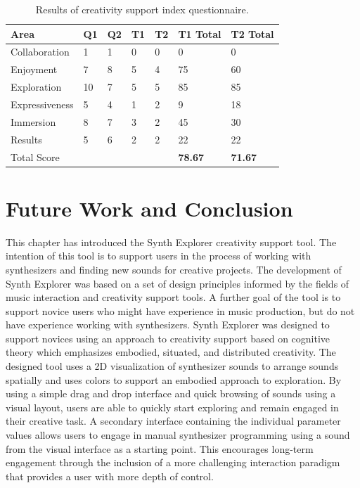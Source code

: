\begin{table}[th]
\centering
\begin{tabular}{l|llll|ll}
Area           & Q1 & Q2 & T1 & T2 & T1 Total   & T2 Total \\
\hline
Collaboration  & 1  & 1  & 0            & 0            & 0              & 0            \\
Enjoyment      & 7  & 8  & 5            & 4            & 75             & 60           \\
Exploration    & 10 & 7  & 5            & 5            & 85             & 85           \\
Expressiveness & 5  & 4  & 1            & 2            & 9              & 18           \\
Immersion      & 8  & 7  & 3            & 2            & 45             & 30           \\
Results        & 5  & 6  & 2            & 2            & 22             & 22           \\
Total Score    &    &    &              &              & \textbf{78.67} & \textbf{71.67} 
\end{tabular}
\caption{Results of creativity support index questionnaire.}
\label{table:csi}
\end{table}

\section{Future Work and Conclusion}
This chapter has introduced the Synth Explorer creativity support tool. The intention of this tool is to support users in the process of working with synthesizers and finding new sounds for creative projects. The development of Synth Explorer was based on a set of design principles informed by the fields of music interaction and creativity support tools. A further goal of the tool is to support novice users who might have experience in music production, but do not have experience working with synthesizers. Synth Explorer was designed to support novices using an approach to creativity support based on cognitive theory which emphasizes embodied, situated, and distributed creativity. The designed tool uses a 2D visualization of synthesizer sounds to arrange sounds spatially and uses colors to support an embodied approach to exploration. By using a simple drag and drop interface and quick browsing of sounds using a visual layout, users are able to quickly start exploring and remain engaged in their creative task. A secondary interface containing the individual parameter values allows users to engage in manual synthesizer programming using a sound from the visual interface as a starting point. This encourages long-term engagement through the inclusion of a more challenging interaction paradigm that provides a user with more depth of control.

